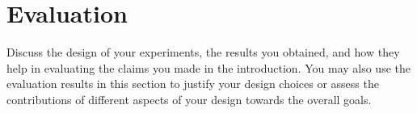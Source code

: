 \section{Evaluation}\label{s:evaluation}

Discuss the design of your experiments, the results you obtained, and how they
help in evaluating the claims you made in the introduction. You may also use the
evaluation results in this section to justify your design choices or assess the
contributions of different aspects  of your design towards the overall goals.

\textcolor{lightgray}{\lipsum[12-28]}


